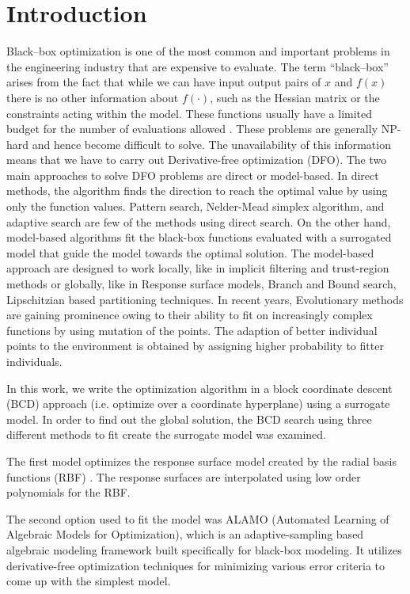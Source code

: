 \chapter{Introduction}
Black–box optimization is one of the most common and important problems in the engineering industry that are expensive to evaluate. The term “black–box” arises from the fact that while we can have input output pairs of $x$ and $f(x)$ there is no other information about $f(\cdot)$, such as the Hessian matrix or the constraints acting within the model. These functions usually have a limited budget for the number of evaluations allowed \cite{Mller2013}. These problems are generally NP-hard and hence become difficult to solve. 
The unavailability of this information means that we have to carry out Derivative-free optimization (DFO). The two main approaches to solve DFO problems are direct or model-based. In direct methods, the algorithm finds the direction to reach the optimal value by using only the function values. Pattern search, Nelder-Mead simplex algorithm, and adaptive search are few of the methods using direct search. On the other hand, model-based algorithms fit the black-box functions evaluated with a surrogated model that guide the model towards the optimal solution. The model-based approach are designed to work locally, like in implicit filtering and trust-region methods or globally, like in Response surface models, Branch and Bound search, Lipschitzian based partitioning techniques. In recent years, Evolutionary methods \cite{Vikhar2016} are gaining prominence owing to their ability to fit on increasingly complex functions by using mutation of the points. The adaption of better individual points to the environment is obtained by assigning higher probability to fitter individuals. 

\bigskip
\noindent
In this work, we write the optimization algorithm in a block coordinate descent (BCD) approach (i.e. optimize over a coordinate hyperplane) using a surrogate model. In order to find out the global solution, the BCD search using three different methods to fit create the surrogate model was examined. 

\bigskip
\noindent
The first model optimizes the response surface model created by the radial basis functions (RBF) \cite{McDonald2007}. The response surfaces are interpolated using low order polynomials for the RBF.

\bigskip
\noindent
The second option used to fit the model was ALAMO (Automated Learning of Algebraic Models for Optimization), which is an adaptive-sampling based algebraic modeling framework built specifically for black-box modeling. It utilizes derivative-free optimization techniques for minimizing various error criteria to come up with the simplest model.

